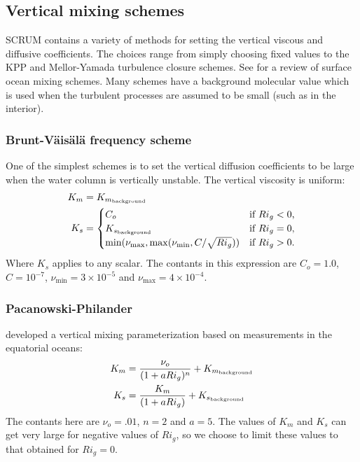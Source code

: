 \subsection{Vertical mixing schemes}
\label{Vmix}
SCRUM contains a variety of methods for setting the vertical viscous and
diffusive coefficients. The choices range from simply choosing fixed
values to the KPP and Mellor-Yamada turbulence closure schemes.
See \citet{Large98} for a review of surface ocean mixing schemes.
Many schemes have a background molecular value which is used when the
turbulent processes are assumed to be small (such as in the interior).

\subsubsection{Brunt-V\"ais\"al\"a frequency scheme}
One of the simplest schemes is to set the vertical diffusion
coefficients to be large when the water column is vertically unstable.
The vertical viscosity is uniform:
\begin{align}
   K_m &= K_{m_{\rm background}} \\
   K_s &=
   \begin{cases}
     C_o &                     \text{if $Ri_g < 0$,} \\
     K_{s_{\rm background}} & \text{if $Ri_g = 0$,} \\
     \min ( \nu_{\max}, \max ( \nu_{\min}, C / \sqrt{Ri_g} )) &
			       \text{if $Ri_g > 0$}.
   \end{cases}
\end{align}
Where $K_s$ applies to any scalar. The contants in this expression are
$C_o = 1.0$, $C = 10^{-7}$, $\nu_{\min} = 3 \times 10^{-5}$ and
$\nu_{\max} = 4 \times 10^{-4}$.

\subsubsection{Pacanowski-Philander}
\citet{Pacanowski81} developed a vertical
mixing parameterization based on measurements in the equatorial oceans:
\begin{align}
   K_m &= {\nu_o \over (1 + a Ri_g)^n} + K_{m_{\rm background}} \\
   K_s &= {K_m \over (1 + a Ri_g)} + K_{s_{\rm background}}
\end{align}
The contants here are $\nu_o = .01$, $n = 2$ and $a = 5$. The values of
$K_m$ and $K_s$ can get very large for negative values of $Ri_g$, so we
choose to limit these values to that obtained for $Ri_g = 0$.

